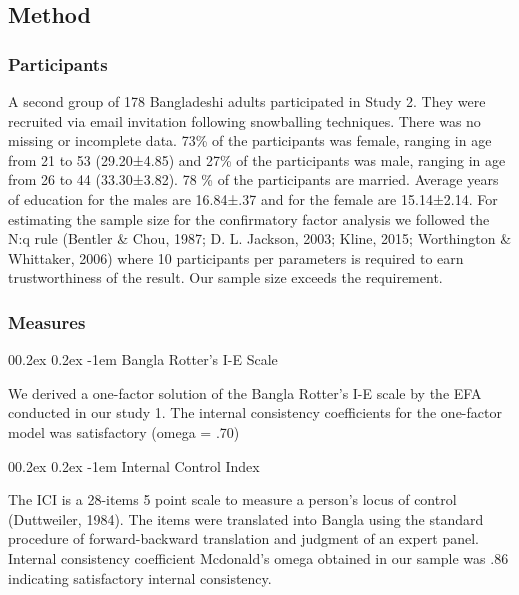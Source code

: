 \documentclass[
  man]{apa6}
\makeatletter
\let\oldparagraph\paragraph
\renewcommand{\paragraph}[1]{\oldparagraph{#1}\mbox{}}
\renewcommand{\paragraph}{\@startsection{paragraph}{4}{\parindent}%
  {0\baselineskip \@plus 0.2ex \@minus 0.2ex}%
  {-1em}%
  {\normalfont\normalsize\bfseries\itshape\typesectitle}}
\makeatother
\begin{document}
\hypertarget{method}{%
\subsection{Method}\label{method}}

\hypertarget{participants-1}{%
\subsubsection{Participants}\label{participants-1}}

A second group of 178 Bangladeshi adults participated in Study 2. They were recruited via email invitation following snowballing techniques. There was no missing or incomplete data. 73\% of the participants was female, ranging in age from 21 to 53 (29.20±4.85) and 27\% of the participants was male, ranging in age from 26 to 44 (33.30±3.82). 78 \% of the participants are married. Average years of education for the males are 16.84±.37 and for the female are 15.14±2.14. For estimating the sample size for the confirmatory factor analysis we followed the N:q rule (Bentler \& Chou, 1987; D. L. Jackson, 2003; Kline, 2015; Worthington \& Whittaker, 2006) where 10 participants per parameters is required to earn trustworthiness of the result. Our sample size exceeds the requirement.

\hypertarget{measures}{%
\subsubsection{Measures}\label{measures}}

\hypertarget{bangla-rotters-i-e-scale}{%
\paragraph{Bangla Rotter's I-E Scale}\label{bangla-rotters-i-e-scale}}

We derived a one-factor solution of the Bangla Rotter's I-E scale by the EFA conducted in our study 1. The internal consistency coefficients for the one-factor model was satisfactory (omega = .70)

\hypertarget{internal-control-index}{%
\paragraph{Internal Control Index}\label{internal-control-index}}

The ICI is a 28-items 5 point scale to measure a person's locus of control (Duttweiler, 1984). The items were translated into Bangla using the standard procedure of forward-backward translation and judgment of an expert panel. Internal consistency coefficient Mcdonald's omega obtained in our sample was .86 indicating satisfactory internal consistency.
\end{document}
